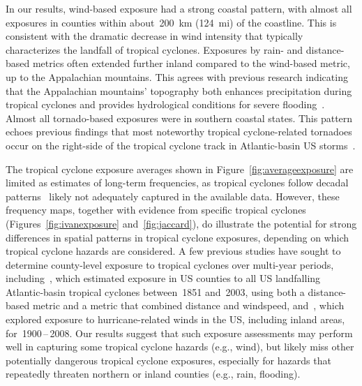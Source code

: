 In our results, wind-based exposure had a strong coastal pattern, with almost
all exposures in counties within about~200~\si{\kilo\metre} (124~mi) of the
coastline. This is consistent with the dramatic decrease in wind intensity that
typically characterizes the landfall of tropical cyclones. Exposures by rain-
and distance-based metrics often extended further inland compared to the
wind-based metric, up to the Appalachian mountains. This agrees with previous
research indicating that the Appalachian mountains' topography both enhances
precipitation during tropical cyclones and provides hydrological conditions for
severe flooding~\parencite{rees2001}.  Almost all tornado-based exposures were in
southern coastal states. This pattern echoes previous findings that most
noteworthy tropical cyclone-related tornadoes occur on the right-side of the
tropical cyclone track in Atlantic-basin \ac{US} storms~\parencite{moore2012}.

The tropical cyclone exposure averages shown in
Figure~\ref{fig:averageexposure} are limited as estimates of long-term
frequencies, as tropical cyclones follow decadal
patterns~\parencite{kossin2007more} likely not adequately captured in the available
data.  However, these frequency maps, together with evidence from specific
tropical cyclones (Figures~\ref{fig:ivanexposure} and~\ref{fig:jaccard}),  do
illustrate the potential for strong differences in spatial patterns in tropical
cyclone exposures, depending on which tropical cyclone hazards are considered.
A few previous studies have sought to determine county-level exposure to
tropical cyclones over multi-year periods, including~\textcite{zandbergen2009},
which estimated exposure in \ac{US} counties to all \ac{US} landfalling
Atlantic-basin tropical cyclones between~1851 and~2003, using both a
distance-based metric and a metric that combined distance and windspeed,
and~\textcite{kruk2010}, which explored exposure to hurricane-related winds in the
\ac{US}, including inland areas, for~1900\,--\,2008.  Our results suggest that
such exposure assessments may perform well in capturing some tropical cyclone
hazards (e.g., wind), but likely miss other potentially dangerous tropical
cyclone exposures, especially for hazards that repeatedly threaten northern or
inland counties (e.g., rain, flooding).

